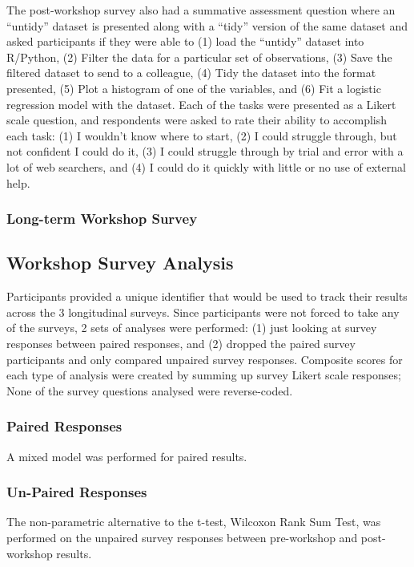 \documentclass[030-workshop.tex]{subfiles}
\begin{document}
          The post-workshop survey also had a summative assessment question
          where an ``untidy'' dataset is presented along with a ``tidy'' version of the same dataset
          and asked participants if they were able to
          (1) load the ``untidy'' dataset into R/Python,
          (2) Filter the data for a particular set of observations,
          (3) Save the filtered dataset to send to a colleague,
          (4) Tidy the dataset into the format presented,
          (5) Plot a histogram of one of the variables, and
          (6) Fit a logistic regression model with the dataset.
          Each of the tasks were presented as a Likert scale question,
          and respondents were asked to rate their ability to accomplish each task:
          (1) I wouldn't know where to start,
          (2) I could struggle through, but not confident I could do it,
          (3) I could struggle through by trial and error with a lot of web searchers, and
          (4) I could do it quickly with little or no use of external help.

  \subsubsection{Long-term Workshop Survey}



  \subsection{Workshop Survey Analysis}

    Participants provided a unique identifier that would be used to track their results across the 3 longitudinal surveys.
    Since participants were not forced to take any of the surveys,
    2 sets of analyses were performed:
    (1) just looking at survey responses between paired responses, and
    (2) dropped the paired survey participants and only compared unpaired survey responses.
    Composite scores for each type of analysis were created by summing up survey Likert scale responses;
    None of the survey questions analysed were reverse-coded.

  \subsubsection{Paired Responses}

      A mixed model was performed for paired results.

  \subsubsection{Un-Paired Responses}

      The non-parametric alternative to the t-test, Wilcoxon Rank Sum Test,
      was performed on the unpaired survey responses between pre-workshop and post-workshop results.
\end{document}
